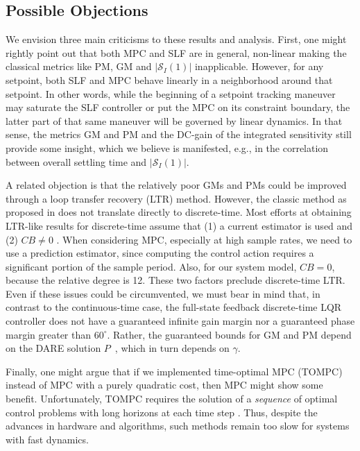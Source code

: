 \documentclass[twocolumn,twoside]{IEEEtran}
\begin{document}
\subsection{Possible Objections}
We envision three main criticisms to these results and analysis. First, one might rightly point out that both MPC and SLF are in general, non-linear making the classical metrics like PM, GM and $|\mathcal{S}_I(1)|$ inapplicable. However, for any setpoint, both SLF and MPC behave linearly in a neighborhood around that setpoint. In other words, while the beginning of a setpoint tracking maneuver may saturate the SLF controller or put the MPC on its constraint boundary, the latter part of that same maneuver will be governed by linear dynamics. In that sense, the metrics GM and PM and the DC-gain of the integrated sensitivity still provide some insight, which we believe is manifested, e.g., in the correlation between overall settling time and $|\mathcal{S}_I(1)|$.

A related objection is that the relatively poor GMs and PMs could be improved through a loop transfer recovery (LTR) method. However, the classic method as proposed in \cite{doyle_robustness_1979} does not translate directly to discrete-time. Most efforts at obtaining LTR-like results for discrete-time assume that (1) a current estimator is used and (2) $CB\neq 0$ \cite{Maciejowski_asymptotic_1985,guaracy_discrete_2015,ishihara_loop_1986}. When considering MPC, especially at high sample rates, we need to use a prediction estimator, since computing the control action requires a significant portion of the sample period. Also, for our system model, $CB=0$, because the relative degree is 12. These two factors preclude discrete-time LTR. Even if these issues could be circumvented, we must bear in mind that, in contrast to the continuous-time case, the full-state feedback discrete-time LQR controller does not have a guaranteed infinite gain margin nor a guaranteed phase margin greater than $60^{\circ}$. Rather, the guaranteed bounds for GM and PM depend on the DARE solution $P$~\cite[p. 136]{andersson_moore}, which in turn depends on $\gamma$. 

Finally, one might argue that if we implemented time-optimal MPC (TOMPC) \cite{broeck_time_2009} instead of MPC with a purely quadratic cost, then MPC might show some benefit. Unfortunately, TOMPC requires the solution of a \emph{sequence} of optimal control problems with long horizons at each time step \cite{broeck_time_2009}. Thus, despite the advances in hardware and algorithms, such methods remain too slow for systems with fast dynamics. 
\end{document}
